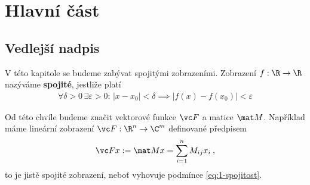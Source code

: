 \section{Hlavní část}

\subsection{Vedlejší nadpis}

V této kapitole se budeme zabývat spojitými zobrazeními. Zobrazení $f: \R \to \R$ nazýváme \textbf{spojité}, jestliže platí \begin{align}
    \forall \delta >0 \, \exists \varepsilon > 0 : \, |x-x_0| < \delta \implies |f(x) - f(x_0)| < \varepsilon \label{eq:1-spojitost}
\end{align}

Od této chvíle budeme značit vektorové funkce $\vc F$ a matice $\mat M$. Například máme lineární zobrazení $\vc F: \R^n \to \C^m$ definované předpisem \begin{align}
    \vc F x := \mat M x = \sum_{i=1}^n M_{ij} x_i \label{eq:2} \:,
\end{align}
to je jistě spojité zobrazení, neboť vyhovuje podmínce \eqref{eq:1-spojitost}.